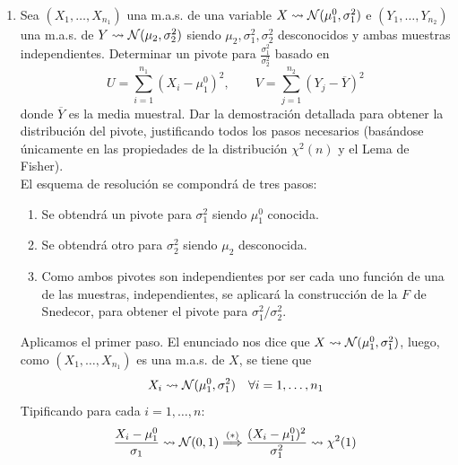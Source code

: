\documentclass[12pt]{article}
\begin{document}
    \begin{ejercicio}
        \ \\
        \begin{enumerate}[label=\alph*)]
            \item Sea $(X_1,\ldots,X_{n_1})$ una m.a.s. de una variable $X\rightsquigarrow \mathcal{N}(\mu_1^0,\sigma^2_1)$ e $(Y_1,\ldots,Y_{n_2})$ una m.a.s. de $Y\rightsquigarrow \mathcal{N}(\mu_2,\sigma_2^2)$ siendo $\mu_2,\sigma_1^2,\sigma_2^2$ desconocidos y ambas muestras independientes. Determinar un pivote para $\frac{\sigma_1^2}{\sigma_2^2}$ basado en
                \begin{equation*}
                    U = \sum_{i=1}^{n_1}{(X_i - \mu_1^0)}^{2}, \qquad V = \sum_{j=1}^{n_2}{(Y_j-\overline{Y})}^{2}
                \end{equation*}
                donde $\overline{Y}$ es la media muestral. Dar la demostración detallada para obtener la distribución del pivote, justificando todos los pasos necesarios (basándose únicamente en las propiedades de la distribución $\chi^2(n)$ y el Lema de Fisher). \\

                El esquema de resolución se compondrá de tres pasos:
                \begin{enumerate}[label=\arabic*)]
                    \item Se obtendrá un pivote para $\sigma_1^2$ siendo $\mu_1^0$ conocida.
                    \item Se obtendrá otro para $\sigma_2^2$ siendo $\mu_2$ desconocida.
                    \item Como ambos pivotes son independientes por ser cada uno función de una de las muestras, independientes, 
                    se aplicará la construcción de la $F$ de Snedecor, para obtener el pivote para $\sigma_1^2 / \sigma_2^2$.
                \end{enumerate}
                
                Aplicamos el primer paso. El enunciado nos dice que $X \rightsquigarrow \mathcal{N}(\mu_1^0, \sigma_1^2)$, luego, 
                como $(X_1, \ldots, X_{n_1})$ es una m.a.s. de $X$, se tiene que $$X_i \rightsquigarrow \mathcal{N}(\mu_1^0, \sigma_1^2) \quad
                \forall i = 1, \ldots, n_1$$ Tipificando para cada $i = 1, \ldots, n$:
                $$\dfrac{X_i - \mu_1^0}{\sigma_1} \rightsquigarrow \mathcal{N}(0,1) \stackrel{(*)}{\Longrightarrow} 
                \dfrac{(X_i - \mu_1^0)^2}{\sigma_1^2} \rightsquigarrow \chi^2(1)$$


\end{enumerate}
\end{ejercicio}
\end{document}
